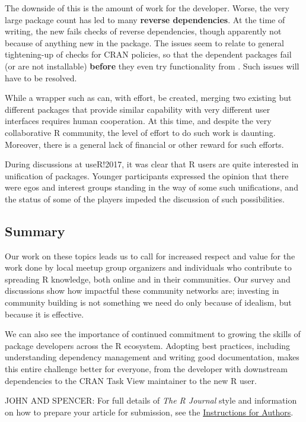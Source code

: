 The downside of this is the amount of work for the developer. Worse, the
very large package count has led to many \textbf{reverse dependencies}.
At the time of writing, the new  fails checks of reverse
dependencies, though apparently not because of anything new in the
package. The issues seem to relate to general tightening-up of checks
for CRAN policies, so that the dependent packages fail (or are not
installable) \textbf{before} they even try functionality from
. Such issues will have to be resolved.

While a wrapper such as  can, with effort, be created,
merging two existing but different packages that provide similar
capability with very different user interfaces requires human
cooperation. At this time, and despite the very collaborative R
community, the level of effort to do such work is daunting. Moreover,
there is a general lack of financial or other reward for such efforts.

During discussions at useR!2017, it was clear that R users are quite
interested in unification of packages. Younger participants expressed
the opinion that there were egos and interest groups standing in the way
of some such unifications, and the status of some of the players impeded
the discussion of such possibilities.

\hypertarget{summary}{%
\subsection{Summary}\label{summary}}

Our work on these topics leads us to call for increased respect and
value for the work done by local meetup group organizers and individuals
who contribute to spreading R knowledge, both online and in their
communities. Our survey and discussions show how impactful these
community networks are; investing in community building is not something
we need do only because of idealism, but because it is effective.

We can also see the importance of continued commitment to growing the
skills of package developers across the R ecosystem. Adopting best
practices, including understanding dependency management and writing
good documentation, makes this entire challenge better for everyone,
from the developer with downstream dependencies to the CRAN Task View
maintainer to the new R user.

JOHN AND SPENCER: For full details of \emph{The R Journal} style and
information on how to prepare your article for submission, see the
\href{https://journal.r-project.org/share/author-guide.pdf}{Instructions
for Authors}.

